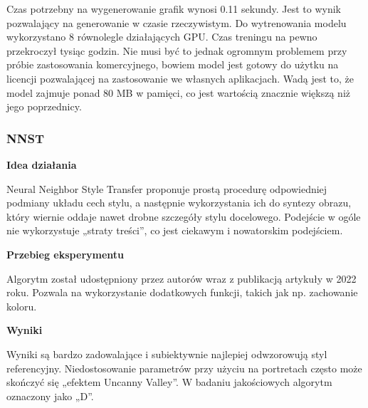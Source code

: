 \documentclass[12pt]{article}
\begin{document}
Czas potrzebny na wygenerowanie grafik wynosi 0.11 sekundy. Jest to wynik pozwalający na generowanie w czasie rzeczywistym. Do wytrenowania modelu wykorzystano 8 równolegle działających GPU. Czas treningu na pewno przekroczył tysiąc godzin. Nie musi być to jednak ogromnym problemem przy próbie zastosowania komercyjnego, bowiem model jest gotowy do użytku na licencji pozwalającej na zastosowanie we własnych aplikacjach. Wadą jest to, że model zajmuje ponad 80 MB w pamięci, co jest wartością znacznie większą niż jego poprzednicy.

\subsubsection{NNST}

\noindent\textbf{Idea działania}

Neural Neighbor Style Transfer proponuje prostą procedurę odpowiedniej podmiany układu cech stylu, a następnie wykorzystania ich do syntezy obrazu, który wiernie oddaje nawet drobne szczegóły stylu docelowego. Podejście w ogóle nie wykorzystuje „straty treści”, co jest ciekawym i nowatorskim podejściem.

\noindent\textbf{Przebieg eksperymentu}

Algorytm został udostępniony przez autorów wraz z publikacją artykuły w 2022 roku. Pozwala na wykorzystanie dodatkowych funkcji, takich jak np. zachowanie koloru.

\noindent\textbf{Wyniki}

Wyniki są bardzo zadowalające i subiektywnie najlepiej odwzorowują styl referencyjny. Niedostosowanie parametrów przy użyciu na portretach często może skończyć się „efektem Uncanny Valley”. W badaniu jakościowych algorytm oznaczony jako „D”.
\end{document}
